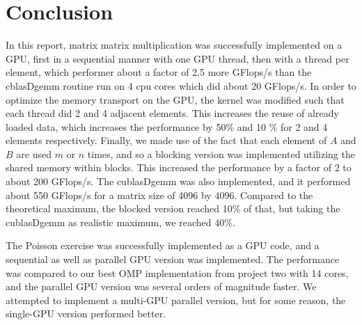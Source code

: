 \section{Conclusion}
In this report, matrix matrix multiplication was successfully implemented on a GPU, first in a sequential manner with one GPU thread, then with a thread per element, which performer about a factor of 2.5 more GFlops/s than the cblasDgemm routine run on 4 cpu cores which did about 20 GFlops/s. In order to optimize the memory transport on the GPU, the kernel was modified such that each thread did 2 and 4 adjacent elements. This increases the reuse of already loaded data, which increases the performance by 50\% and 10 \% for 2 and 4 elements respectively. Finally, we made use of the fact that each element of $A$ and $B$ are used $m$ or $n$ times, and so a blocking version was implemented utilizing the shared memory within blocks. This increased the performance by a factor of 2 to about 200 GFlops/s. The cublasDgemm was also implemented, and it performed about 550 GFlops/s for a matrix size of 4096 by 4096. Compared to the theoretical maximum, the blocked version reached 10\% of that, but taking the cublasDgemm as realistic maximum, we reached 40\%.

The Poisson exercise was successfully implemented as a GPU code, and a sequential as well as parallel GPU version was implemented. The performance was compared to our best OMP implementation from project two with 14 cores, and the parallel GPU version was several orders of magnitude faster. We attempted to implement a multi-GPU parallel version, but for some reason, the single-GPU version performed better.